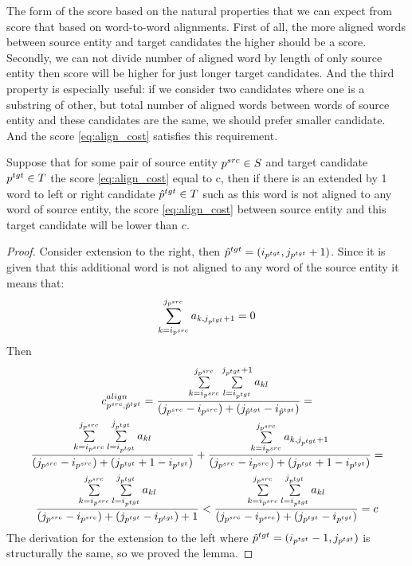 The form of the score based on the natural properties that we can expect from score that based on word-to-word alignments.
First of all, the more aligned words between source entity and target candidates the higher should be a score.
Secondly, we can not divide number of aligned word by length of only source entity then
score will be higher for just longer target candidates.
And the third property is especially useful: if we consider two candidates where one is a
substring of other, but total number of aligned words between words of
source entity and these candidates are the same, we should prefer smaller candidate.
And the score \eqref{eq:align_cost} satisfies this requirement.
\begin{lemma} \label{lemma:align_cost_decrease}
  Suppose that for some pair of source entity \( p^{src} \in S \) and target candidate \( p^{tgt} \in T \)
  the score \eqref{eq:align_cost} equal to c, then if there is an extended by 1 word to left or
  right candidate \( \hat{p}^{tgt} \in T \) such as this word is not aligned to any word of source
  entity, the score \eqref{eq:align_cost} between source entity and this target candidate
  will be lower than \( c \).
\end{lemma}
\begin{proof}
  Consider extension to the right, then \( \hat{p}^{tgt} = (i_{p^{tgt}}, j_{p^{tgt}} + 1) \). Since it is
  given that this additional word is not aligned to any word of the source entity it means that:
  \[
    \sum\limits_{k=i_{p^{src}}}^{j_{p^{src}}} a_{k,j_{p^{tgt}} + 1} = 0
  \]
  Then
  \begin{multline*}
    c_{p^{src}, \hat{p}^{tgt}}^{align} =
    \frac{\sum\limits_{k=i_{p^{src}}}^{j_{p^{src}}} \sum\limits_{l=i_{p^{tgt}}}^{j_{p^{tgt}} + 1} a_{kl}}
    {(j_{p^{src}} - i_{p^{src}}) + (j_{\hat{p}^{tgt}} - i_{\hat{p}^{tgt}})} =                                \\
    \frac{\sum\limits_{k=i_{p^{src}}}^{j_{p^{src}}} \sum\limits_{l=i_{p^{tgt}}}^{j_{p^{tgt}}} a_{kl}}
    {(j_{p^{src}} - i_{p^{src}}) + (j_{p^{tgt}} + 1 - i_{p^{tgt}})} +
    \frac{\sum\limits_{k=i_{p^{src}}}^{j_{p^{src}}} a_{k,j_{p^{tgt}} + 1}}
    {(j_{p^{src}} - i_{p^{src}}) + (j_{p^{tgt}} + 1 - i_{p^{tgt}})} =                                        \\
    \frac{\sum\limits_{k=i_{p^{src}}}^{j_{p^{src}}} \sum\limits_{l=i_{p^{tgt}}}^{j_{p^{tgt}}} a_{kl}}
    {(j_{p^{src}} - i_{p^{src}}) + (j_{p^{tgt}} - i_{p^{tgt}}) + 1} <
    \frac{\sum\limits_{k=i_{p^{src}}}^{j_{p^{src}}} \sum\limits_{l=i_{p^{tgt}}}^{j_{p^{tgt}}} a_{kl}}
    {(j_{p^{src}} - i_{p^{src}}) + (j_{p^{tgt}} - i_{p^{tgt}})} = c
  \end{multline*}
  The derivation for the extension to the left where \( \hat{p}^{tgt} = (i_{p^{tgt}} - 1, j_{p^{tgt}}) \) is structurally the same, so we
  proved the lemma.
\end{proof}

